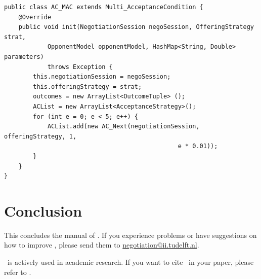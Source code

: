 \documentclass[]{article}
\begin{document}
\begin{lstlisting}
public class AC_MAC extends Multi_AcceptanceCondition {
	@Override
	public void init(NegotiationSession negoSession, OfferingStrategy strat, 
			OpponentModel opponentModel, HashMap<String, Double> parameters)
			throws Exception {
		this.negotiationSession = negoSession;
		this.offeringStrategy = strat;
		outcomes = new ArrayList<OutcomeTuple> ();
		ACList = new ArrayList<AcceptanceStrategy>();
		for (int e = 0; e < 5; e++) {
			ACList.add(new AC_Next(negotiationSession, offeringStrategy, 1, 
												e * 0.01));
		}
	}
}

\end{lstlisting}

\section{Conclusion}
This concludes the manual of \Genius. If you experience problems or have suggestions on how to improve \Genius, please send them to \url{negotiation@ii.tudelft.nl}. 

\Genius\ is actively used in academic research. If you want to cite \Genius\ in your paper, please refer to \cite{Genius}.




\end{document}
